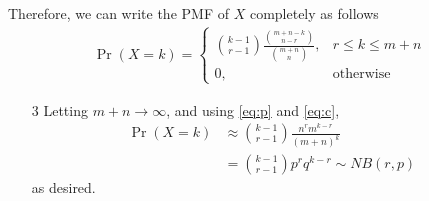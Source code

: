 \documentclass{beamer}
\providecommand{\pr}[1]{\ensuremath{\Pr\left(#1\right)}}
\begin{document}
\begin{frame}
	Therefore, we can write the PMF of $X$ completely as follows
	\begin{align}
		\pr{X = k} =
		\begin{cases}
			\binom{k - 1}{r - 1}\frac{\binom{m + n - k}{n - r}}{\binom{m + n}{n}}, & r \leq k \leq m + n \\
			0, & \textrm{otherwise}
		\end{cases}
		\label{eq:full-pmf}
	\end{align}
	\begin{enumerate}
		\item[3] Letting $m + n \to \infty$, and using \eqref{eq:p} and \eqref{eq:c},
			\begin{align}
				\pr{X = k} &\approx \binom{k - 1}{r - 1}\frac{n^rm^{k - r}}{(m + n)^k} \\
				&= \binom{k - 1}{r - 1}p^rq^{k - r} \sim NB(r, p)
				\label{eq:lim}
			\end{align}
			as desired.
	\end{enumerate}
\end{frame}
\end{document}
